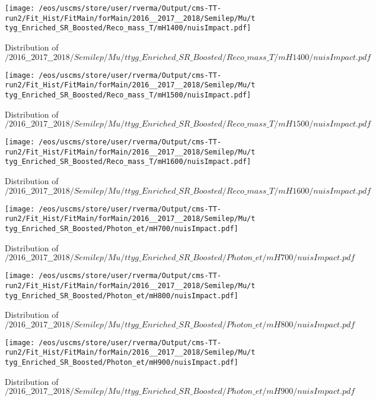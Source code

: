 \begin{figure}
\centering
\texttt{[image: /eos/uscms/store/user/rverma/Output/cms-TT-run2/Fit\_Hist/FitMain/forMain/2016\_\_2017\_\_2018/Semilep/Mu/ttyg\_Enriched\_SR\_Boosted/Reco\_mass\_T/mH1400/nuisImpact.pdf]}
\caption{Distribution of $/2016\_\_2017\_\_2018/Semilep/Mu/ttyg\_Enriched\_SR\_Boosted/Reco\_mass\_T/mH1400/nuisImpact.pdf$}
\end{figure}

\begin{figure}
\centering
\texttt{[image: /eos/uscms/store/user/rverma/Output/cms-TT-run2/Fit\_Hist/FitMain/forMain/2016\_\_2017\_\_2018/Semilep/Mu/ttyg\_Enriched\_SR\_Boosted/Reco\_mass\_T/mH1500/nuisImpact.pdf]}
\caption{Distribution of $/2016\_\_2017\_\_2018/Semilep/Mu/ttyg\_Enriched\_SR\_Boosted/Reco\_mass\_T/mH1500/nuisImpact.pdf$}
\end{figure}

\begin{figure}
\centering
\texttt{[image: /eos/uscms/store/user/rverma/Output/cms-TT-run2/Fit\_Hist/FitMain/forMain/2016\_\_2017\_\_2018/Semilep/Mu/ttyg\_Enriched\_SR\_Boosted/Reco\_mass\_T/mH1600/nuisImpact.pdf]}
\caption{Distribution of $/2016\_\_2017\_\_2018/Semilep/Mu/ttyg\_Enriched\_SR\_Boosted/Reco\_mass\_T/mH1600/nuisImpact.pdf$}
\end{figure}

\begin{figure}
\centering
\texttt{[image: /eos/uscms/store/user/rverma/Output/cms-TT-run2/Fit\_Hist/FitMain/forMain/2016\_\_2017\_\_2018/Semilep/Mu/ttyg\_Enriched\_SR\_Boosted/Photon\_et/mH700/nuisImpact.pdf]}
\caption{Distribution of $/2016\_\_2017\_\_2018/Semilep/Mu/ttyg\_Enriched\_SR\_Boosted/Photon\_et/mH700/nuisImpact.pdf$}
\end{figure}

\begin{figure}
\centering
\texttt{[image: /eos/uscms/store/user/rverma/Output/cms-TT-run2/Fit\_Hist/FitMain/forMain/2016\_\_2017\_\_2018/Semilep/Mu/ttyg\_Enriched\_SR\_Boosted/Photon\_et/mH800/nuisImpact.pdf]}
\caption{Distribution of $/2016\_\_2017\_\_2018/Semilep/Mu/ttyg\_Enriched\_SR\_Boosted/Photon\_et/mH800/nuisImpact.pdf$}
\end{figure}

\begin{figure}
\centering
\texttt{[image: /eos/uscms/store/user/rverma/Output/cms-TT-run2/Fit\_Hist/FitMain/forMain/2016\_\_2017\_\_2018/Semilep/Mu/ttyg\_Enriched\_SR\_Boosted/Photon\_et/mH900/nuisImpact.pdf]}
\caption{Distribution of $/2016\_\_2017\_\_2018/Semilep/Mu/ttyg\_Enriched\_SR\_Boosted/Photon\_et/mH900/nuisImpact.pdf$}
\end{figure}

